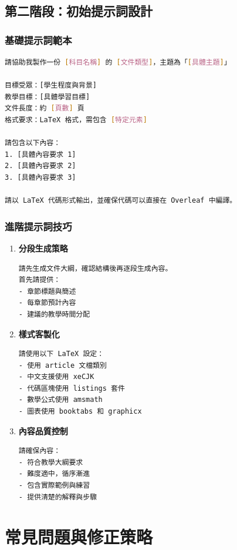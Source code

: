 \documentclass[12pt,a4paper]{article}
\begin{document}
\subsection{第二階段：初始提示詞設計}

\subsubsection{基礎提示詞範本}

\begin{lstlisting}[language=bash]
請協助我製作一份 [科目名稱] 的 [文件類型]，主題為「[具體主題]」

目標受眾：[學生程度與背景]
教學目標：[具體學習目標]
文件長度：約 [頁數] 頁
格式要求：LaTeX 格式，需包含 [特定元素]

請包含以下內容：
1. [具體內容要求 1]
2. [具體內容要求 2]
3. [具體內容要求 3]

請以 LaTeX 代碼形式輸出，並確保代碼可以直接在 Overleaf 中編譯。
\end{lstlisting}

\subsubsection{進階提示詞技巧}

\begin{enumerate}
    \item \textbf{分段生成策略}
    \begin{lstlisting}[language=bash]
請先生成文件大綱，確認結構後再逐段生成內容。
首先請提供：
- 章節標題與簡述
- 每章節預計內容
- 建議的教學時間分配
    \end{lstlisting}

    \item \textbf{樣式客製化}
    \begin{lstlisting}[language=bash]
請使用以下 LaTeX 設定：
- 使用 article 文檔類別
- 中文支援使用 xeCJK
- 代碼區塊使用 listings 套件
- 數學公式使用 amsmath
- 圖表使用 booktabs 和 graphicx
    \end{lstlisting}

    \item \textbf{內容品質控制}
    \begin{lstlisting}[language=bash]
請確保內容：
- 符合教學大綱要求
- 難度適中，循序漸進
- 包含實際範例與練習
- 提供清楚的解釋與步驟
    \end{lstlisting}
\end{enumerate}

\section{常見問題與修正策略}
\end{document}
